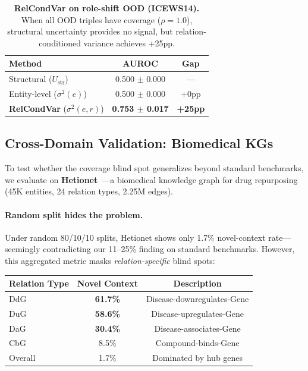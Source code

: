 \begin{table}[ht]
\centering
\caption{\textbf{RelCondVar on role-shift OOD (ICEWS14).} When all OOD triples have coverage ($\rho=1.0$), structural uncertainty provides no signal, but relation-conditioned variance achieves +25pp.\label{tab:relcondvar}}
\begin{tabular}{lcc}
\toprule
Method & AUROC & Gap \\
\midrule
Structural ($U_{\text{str}}$) & 0.500 $\pm$ 0.000 & --- \\
Entity-level ($\sigma^2(e)$) & 0.500 $\pm$ 0.000 & +0pp \\
\textbf{RelCondVar} ($\sigma^2(e,r)$) & \textbf{0.753 $\pm$ 0.017} & \textbf{+25pp} \\
\bottomrule
\end{tabular}
\end{table}

\subsection{Cross-Domain Validation: Biomedical KGs}
\label{sec:biomedical}

To test whether the coverage blind spot generalizes beyond standard benchmarks, we evaluate on \textbf{Hetionet}~\citep{himmelstein2017systematic}---a biomedical knowledge graph for drug repurposing (45K entities, 24 relation types, 2.25M edges).

\paragraph{Random split hides the problem.}
Under random 80/10/10 splits, Hetionet shows only 1.7\% novel-context rate---seemingly contradicting our 11--25\% finding on standard benchmarks. However, this aggregated metric masks \emph{relation-specific} blind spots:

\begin{center}
\small
\begin{tabular}{lcc}
\toprule
Relation Type & Novel Context & Description \\
\midrule
DdG & \textbf{61.7\%} & Disease-downregulates-Gene \\
DuG & \textbf{58.6\%} & Disease-upregulates-Gene \\
DaG & \textbf{30.4\%} & Disease-associates-Gene \\
CbG & 8.5\% & Compound-binds-Gene \\
Overall & 1.7\% & Dominated by hub genes \\
\bottomrule
\end{tabular}
\end{center}

